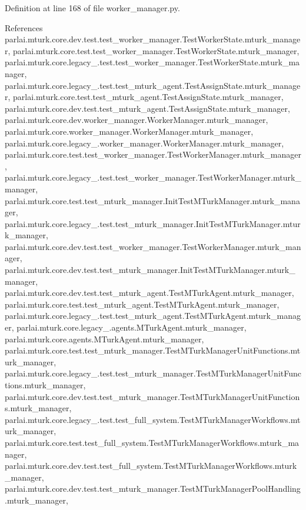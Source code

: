 Definition at line 168 of file worker\+\_\+manager.\+py.



References parlai.\+mturk.\+core.\+dev.\+test.\+test\+\_\+worker\+\_\+manager.\+Test\+Worker\+State.\+mturk\+\_\+manager, parlai.\+mturk.\+core.\+test.\+test\+\_\+worker\+\_\+manager.\+Test\+Worker\+State.\+mturk\+\_\+manager, parlai.\+mturk.\+core.\+legacy\+\_.\+test.\+test\+\_\+worker\+\_\+manager.\+Test\+Worker\+State.\+mturk\+\_\+manager, parlai.\+mturk.\+core.\+legacy\+\_.\+test.\+test\+\_\+mturk\+\_\+agent.\+Test\+Assign\+State.\+mturk\+\_\+manager, parlai.\+mturk.\+core.\+test.\+test\+\_\+mturk\+\_\+agent.\+Test\+Assign\+State.\+mturk\+\_\+manager, parlai.\+mturk.\+core.\+dev.\+test.\+test\+\_\+mturk\+\_\+agent.\+Test\+Assign\+State.\+mturk\+\_\+manager, parlai.\+mturk.\+core.\+dev.\+worker\+\_\+manager.\+Worker\+Manager.\+mturk\+\_\+manager, parlai.\+mturk.\+core.\+worker\+\_\+manager.\+Worker\+Manager.\+mturk\+\_\+manager, parlai.\+mturk.\+core.\+legacy\+\_.\+worker\+\_\+manager.\+Worker\+Manager.\+mturk\+\_\+manager, parlai.\+mturk.\+core.\+test.\+test\+\_\+worker\+\_\+manager.\+Test\+Worker\+Manager.\+mturk\+\_\+manager, parlai.\+mturk.\+core.\+legacy\+\_.\+test.\+test\+\_\+worker\+\_\+manager.\+Test\+Worker\+Manager.\+mturk\+\_\+manager, parlai.\+mturk.\+core.\+test.\+test\+\_\+mturk\+\_\+manager.\+Init\+Test\+M\+Turk\+Manager.\+mturk\+\_\+manager, parlai.\+mturk.\+core.\+legacy\+\_.\+test.\+test\+\_\+mturk\+\_\+manager.\+Init\+Test\+M\+Turk\+Manager.\+mturk\+\_\+manager, parlai.\+mturk.\+core.\+dev.\+test.\+test\+\_\+worker\+\_\+manager.\+Test\+Worker\+Manager.\+mturk\+\_\+manager, parlai.\+mturk.\+core.\+dev.\+test.\+test\+\_\+mturk\+\_\+manager.\+Init\+Test\+M\+Turk\+Manager.\+mturk\+\_\+manager, parlai.\+mturk.\+core.\+dev.\+test.\+test\+\_\+mturk\+\_\+agent.\+Test\+M\+Turk\+Agent.\+mturk\+\_\+manager, parlai.\+mturk.\+core.\+test.\+test\+\_\+mturk\+\_\+agent.\+Test\+M\+Turk\+Agent.\+mturk\+\_\+manager, parlai.\+mturk.\+core.\+legacy\+\_.\+test.\+test\+\_\+mturk\+\_\+agent.\+Test\+M\+Turk\+Agent.\+mturk\+\_\+manager, parlai.\+mturk.\+core.\+legacy\+\_.\+agents.\+M\+Turk\+Agent.\+mturk\+\_\+manager, parlai.\+mturk.\+core.\+agents.\+M\+Turk\+Agent.\+mturk\+\_\+manager, parlai.\+mturk.\+core.\+test.\+test\+\_\+mturk\+\_\+manager.\+Test\+M\+Turk\+Manager\+Unit\+Functions.\+mturk\+\_\+manager, parlai.\+mturk.\+core.\+legacy\+\_.\+test.\+test\+\_\+mturk\+\_\+manager.\+Test\+M\+Turk\+Manager\+Unit\+Functions.\+mturk\+\_\+manager, parlai.\+mturk.\+core.\+dev.\+test.\+test\+\_\+mturk\+\_\+manager.\+Test\+M\+Turk\+Manager\+Unit\+Functions.\+mturk\+\_\+manager, parlai.\+mturk.\+core.\+legacy\+\_.\+test.\+test\+\_\+full\+\_\+system.\+Test\+M\+Turk\+Manager\+Workflows.\+mturk\+\_\+manager, parlai.\+mturk.\+core.\+test.\+test\+\_\+full\+\_\+system.\+Test\+M\+Turk\+Manager\+Workflows.\+mturk\+\_\+manager, parlai.\+mturk.\+core.\+dev.\+test.\+test\+\_\+full\+\_\+system.\+Test\+M\+Turk\+Manager\+Workflows.\+mturk\+\_\+manager, parlai.\+mturk.\+core.\+dev.\+test.\+test\+\_\+mturk\+\_\+manager.\+Test\+M\+Turk\+Manager\+Pool\+Handling.\+mturk\+\_\+manager, 